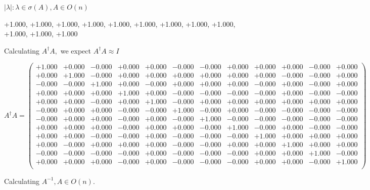 \documentclass[9pt]{article}
\theoremstyle{plain}
\theoremstyle{definition}
\theoremstyle{remark}
\numberwithin{equation}{section}
\begin{document}
 $|\lambda | : \lambda \in \sigma(A) , A \in O(n)$

+1.000, +1.000, +1.000, +1.000, +1.000, +1.000, +1.000, +1.000, +1.000, +1.000, +1.000, +1.000


Calculating $A^{\dag} A,$  we expect $A^{\dag} A \approx I$

$A^{\dag} A = \left(
\begin{array}{
cccccccccccc}
+1.000 & +0.000 & -0.000 & +0.000 & +0.000 & -0.000 & -0.000 & +0.000 & +0.000 & +0.000 & -0.000 & +0.000 \\
+0.000 & +1.000 & -0.000 & +0.000 & +0.000 & +0.000 & +0.000 & +0.000 & +0.000 & -0.000 & -0.000 & +0.000 \\
-0.000 & -0.000 & +1.000 & +0.000 & -0.000 & +0.000 & +0.000 & +0.000 & -0.000 & +0.000 & -0.000 & +0.000 \\
+0.000 & +0.000 & +0.000 & +1.000 & +0.000 & -0.000 & -0.000 & -0.000 & -0.000 & +0.000 & -0.000 & -0.000 \\
+0.000 & +0.000 & -0.000 & +0.000 & +1.000 & -0.000 & +0.000 & +0.000 & +0.000 & +0.000 & +0.000 & +0.000 \\
-0.000 & +0.000 & +0.000 & -0.000 & -0.000 & +1.000 & -0.000 & +0.000 & -0.000 & -0.000 & -0.000 & -0.000 \\
-0.000 & +0.000 & +0.000 & -0.000 & +0.000 & -0.000 & +1.000 & -0.000 & -0.000 & -0.000 & -0.000 & -0.000 \\
+0.000 & +0.000 & +0.000 & -0.000 & +0.000 & +0.000 & -0.000 & +1.000 & -0.000 & +0.000 & -0.000 & -0.000 \\
+0.000 & +0.000 & -0.000 & -0.000 & +0.000 & -0.000 & -0.000 & -0.000 & +1.000 & +0.000 & +0.000 & +0.000 \\
+0.000 & -0.000 & +0.000 & +0.000 & +0.000 & -0.000 & -0.000 & +0.000 & +0.000 & +1.000 & +0.000 & +0.000 \\
-0.000 & -0.000 & -0.000 & -0.000 & +0.000 & -0.000 & -0.000 & -0.000 & +0.000 & +0.000 & +1.000 & -0.000 \\
+0.000 & +0.000 & +0.000 & -0.000 & +0.000 & -0.000 & -0.000 & -0.000 & +0.000 & +0.000 & -0.000 & +1.000 \\
\end{array}
\right)$ \newline 

Calculating $A^{-1} ,  A \in O(n)$.
\end{document}
